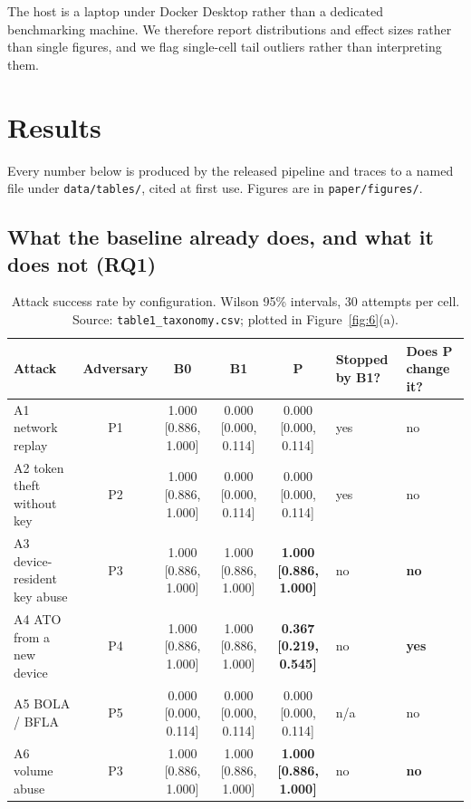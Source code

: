 The host is a laptop under Docker Desktop rather than a dedicated benchmarking machine. We therefore report distributions and effect sizes rather than single figures, and we flag single-cell tail outliers rather than interpreting them.

\section{Results}
\label{sec:results}

Every number below is produced by the released pipeline and traces to a named file under \texttt{data/tables/}, cited at first use. Figures are in \texttt{paper/figures/}.

\subsection{What the baseline already does, and what it does not (RQ1)}
\label{sec:res-baseline}

\setcounter{table}{1}
\begin{table}[t]
\centering
\caption{Attack success rate by configuration. Wilson 95\% intervals, 30 attempts per cell. Source: \texttt{table1\_taxonomy.csv}; plotted in Figure~\ref{fig:6}(a).}
\label{tab:2}
\small
\begin{tabular}{lccccll}
\toprule
Attack & Adversary & B0 & B1 & P & Stopped by B1? & Does P change it? \\
\midrule
A1 network replay & P1 & 1.000 [0.886, 1.000] & 0.000 [0.000, 0.114] & 0.000 [0.000, 0.114] & yes & no \\
A2 token theft without key & P2 & 1.000 [0.886, 1.000] & 0.000 [0.000, 0.114] & 0.000 [0.000, 0.114] & yes & no \\
A3 device-resident key abuse & P3 & 1.000 [0.886, 1.000] & 1.000 [0.886, 1.000] & \textbf{1.000 [0.886, 1.000]} & no & \textbf{no} \\
A4 ATO from a new device & P4 & 1.000 [0.886, 1.000] & 1.000 [0.886, 1.000] & \textbf{0.367 [0.219, 0.545]} & no & \textbf{yes} \\
A5 BOLA / BFLA & P5 & 0.000 [0.000, 0.114] & 0.000 [0.000, 0.114] & 0.000 [0.000, 0.114] & n/a & no \\
A6 volume abuse & P3 & 1.000 [0.886, 1.000] & 1.000 [0.886, 1.000] & \textbf{1.000 [0.886, 1.000]} & no & \textbf{no} \\
\bottomrule
\end{tabular}
\end{table}

